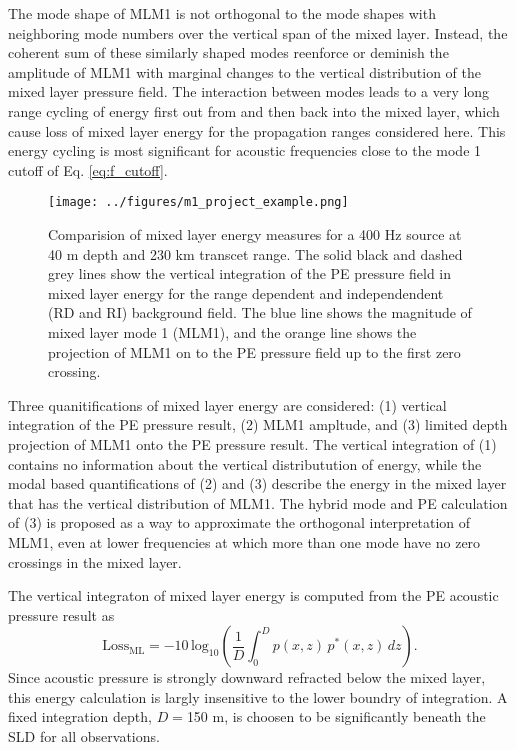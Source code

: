 \documentclass[preprint,NumberedRefs]{JASA}
\begin{document}
The mode shape of MLM1 is not orthogonal to the mode shapes with neighboring mode numbers over the vertical span of the mixed layer. Instead, the coherent sum of these similarly shaped modes reenforce or deminish the amplitude of MLM1 with marginal changes to the vertical distribution of the mixed layer pressure field. The interaction between modes leads to a very long range cycling of energy first out from and then back into the mixed layer, which cause loss of mixed layer energy for the propagation ranges considered here. This energy cycling is most significant for acoustic frequencies close to the mode 1 cutoff of Eq. \eqref{eq:f_cutoff}.

\begin{figure}
\texttt{[image: ../figures/m1\_project\_example.png]}
    \caption{\label{fig:energy_methods}{Comparision of mixed layer energy measures for a 400 Hz source at 40 m depth and 230 km transcet range. The solid black and dashed grey lines show the vertical integration of the PE pressure field in mixed layer energy for the range dependent and independendent (RD and RI) background field. The blue line shows the magnitude of mixed layer mode 1 (MLM1), and the orange line shows the projection of MLM1 on to the PE pressure field up to the first zero crossing.}}
\end{figure}

Three quanitifications of mixed layer energy are considered: (1) vertical integration of the PE pressure result, (2) MLM1 ampltude, and (3) limited depth projection of MLM1 onto the PE pressure result. The vertical integration of (1) contains no information about the vertical distributution of energy, while the modal based quantifications of (2) and (3) describe the energy in the mixed layer that has the vertical distribution of MLM1. The hybrid mode and PE calculation of (3) is proposed as a way to approximate the orthogonal interpretation of MLM1, even at lower frequencies at which more than one mode have no zero crossings in the mixed layer.

The vertical integraton of mixed layer energy is computed from the PE acoustic pressure result as
\begin{equation}
    \textrm{Loss}_{\textrm{ML}} = -10 \, \textrm{log}_{10} \left( \frac{1}{D} \int^{D}_0 p(x, z) \, p^* (x, z) \,  dz \right).
    \label{eq:int_eng}
\end{equation}
Since acoustic pressure is strongly downward refracted below the mixed layer, this energy calculation is largly insensitive to the lower boundry of integration. A fixed integration depth, $D=$150 m, is choosen to be significantly beneath the SLD for all observations.
\end{document}
